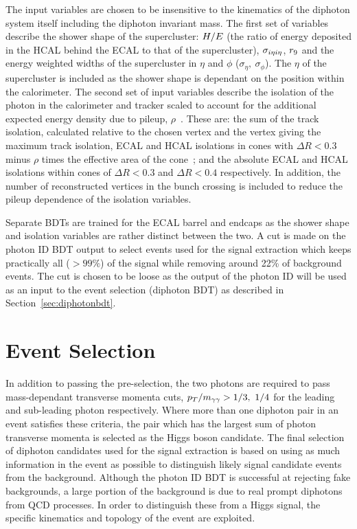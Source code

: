 The input variables are chosen to be insensitive to the kinematics of the diphoton system itself
including the diphoton invariant mass. The first set of variables describe the shower shape of the 
supercluster: $H/E$ (the ratio of energy deposited in the HCAL behind the ECAL to that of the supercluster), 
$\sigma_{i\eta i\eta}$, $r_{9}$ and the energy weighted widths of the supercluster in
$\eta$ and $\phi$ ($\sigma_{\eta},~\sigma_{\phi}$). The $\eta$ of the supercluster is 
included as the shower shape is dependant on the position within the calorimeter. 
The second set of input variables describe the
isolation of the photon in the calorimeter and tracker scaled to account for 
the additional expected energy density due to pileup, $\rho$~\citep{2011JInst611002C}. 
These are: the sum of the track isolation, 
calculated relative to the chosen vertex and the vertex giving the maximum track isolation,
ECAL and HCAL isolations in cones with $\Delta R<0.3$ minus $\rho$ times the effective area 
of the cone~\citep{2011JInst611002C}; 
and the absolute ECAL and HCAL isolations within cones of $\Delta R <0.3$ and $\Delta R<0.4$ 
respectively. In addition, the number of reconstructed vertices in the bunch crossing is included
to reduce the pileup dependence of the isolation variables. 

Separate BDTs are trained for the ECAL barrel and endcaps as the shower
shape and isolation variables are rather distinct between the two. 
A cut is made on the photon ID BDT output to select events used for the signal extraction which
keeps practically all ($>99\%$) of the signal while removing around 22\% of background events.
The cut is chosen to be loose as the output of the photon ID will be used as an input to the 
event selection (diphoton BDT) as described in Section~\ref{sec:diphotonbdt}. 

\section{Event Selection}
\label{sec:eventselection}

In addition to passing the pre-selection, the two photons are required to pass mass-dependant transverse 
momenta cuts, $p_{T}/m_{\gamma\gamma} > 1/3, ~1/4$ for the leading and sub-leading photon respectively.
Where more than one diphoton pair in an event satisfies these criteria, the pair which has the largest
sum of photon transverse momenta is selected as the Higgs boson candidate.
The final selection of diphoton candidates used for the signal extraction is based on using as much information 
in the event as possible to distinguish likely signal candidate events from the background. Although the 
photon ID BDT is successful at rejecting fake backgrounds, a large portion of the background is due to
real prompt diphotons from QCD processes. In order to distinguish these from a Higgs signal, 
the specific kinematics and topology of the event are exploited.

